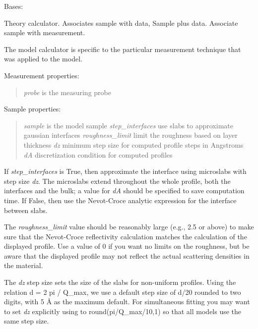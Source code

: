 \documentclass[letterpaper,10pt,english]{sphinxmanual}
\begin{document}
\begin{fulllineitems}
\label{api/experiment:refl1d.experiment.Experiment}
Bases: {\hyperref[api/experiment:refl1d.experiment.ExperimentBase]{}}

Theory calculator.  Associates sample with data, Sample plus data.
Associate sample with measurement.

The model calculator is specific to the particular measurement technique
that was applied to the model.

Measurement properties:
\begin{quote}

\emph{probe} is the measuring probe
\end{quote}

Sample properties:
\begin{quote}

\emph{sample} is the model sample
\emph{step\_interfaces} use slabs to approximate gaussian interfaces
\emph{roughness\_limit} limit the roughness based on layer thickness
\emph{dz} minimum step size for computed profile steps in Angstroms
\emph{dA} discretization condition for computed profiles
\end{quote}

If \emph{step\_interfaces} is True, then approximate the interface using
microslabs with step size \emph{dz}.  The microslabs extend throughout
the whole profile, both the interfaces and the bulk; a value
for \emph{dA} should be specified to save computation time.  If False, then
use the Nevot-Croce analytic expression for the interface between slabs.

The \emph{roughness\_limit} value should be reasonably large (e.g., 2.5 or above)
to make sure that the Nevot-Croce reflectivity calculation matches the
calculation of the displayed profile.  Use a value of 0 if you want no
limits on the roughness,  but be aware that the displayed profile may
not reflect the actual scattering densities in the material.

The \emph{dz} step size sets the size of the slabs for non-uniform profiles.
Using the relation d = 2 pi / Q\_max,  we use a default step size of d/20
rounded to two digits, with 5 Å as the maximum default.  For
simultaneous fitting you may want to set \emph{dz} explicitly using to
round(pi/Q\_max/10,1) so that all models use the same step size.


\end{fulllineitems}
\end{document}
